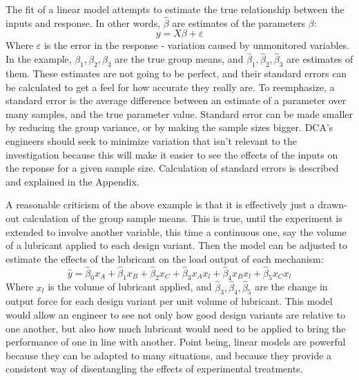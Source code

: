 \documentclass[11pt,a4paper,article]{memoir} %
\begin{document}
The fit of a linear model attempts to estimate the true relationship between the inputs and response. In other words, $\hat{\beta}$ are estimates of the parameters $\beta$:
\begin{equation}
	y = X\beta + \varepsilon
\end{equation}
Where $\varepsilon$ is the error in the response - variation caused by unmonitored variables. In the example, $\beta_1, \beta_2, \beta_3$ are the true group means, and $\hat{\beta}_1, \hat{\beta}_2, \hat{\beta}_3$ are estimates of them. These estimates are not going to be perfect, and their standard errors can be calculated to get a feel for how accurate they really are. To reemphasize, a standard error is the average difference between an estimate of a parameter over many samples, and the true parameter value. Standard error can be made smaller by reducing the group variance, or by making the sample sizes bigger.  DCA's engineers should seek to minimize variation that isn't relevant to the investigation because this will make it easier to see the effects of the inputs on the reponse for a given sample size. Calculation of standard errors is described and explained in the Appendix.

A reasonable criticism of the above example is that it is effectively just a drawn-out calculation of the group sample means. This is true, until the experiment is extended to involve another variable, this time a continuous one, say the volume of a lubricant applied to each design variant. Then the model can be adjusted to estimate the effects of the lubricant on the load output of each mechanism:
\begin{equation}
	\hat{y} = \hat{\beta}_0 x_A + \hat{\beta}_{1}x_B + \hat{\beta}_{2}x_C + \hat{\beta}_3 x_A x_l + \hat{\beta}_4 x_B x_l + \hat{\beta}_5 x_C x_l
\end{equation}
Where $x_l$ is the volume of lubricant applied, and $\hat{\beta}_3, \hat{\beta}_4, \hat{\beta}_5$ are the change in output force for each design variant per unit volume of lubricant. This model would allow an engineer to see not only how good design variants are relative to one another, but also how much lubricant would need to be applied to bring the performance of one in line with another. Point being, linear models are powerful because they can be adapted to many situations, and because they provide a consistent way of disentangling the effects of experimental treatments.
\end{document}

